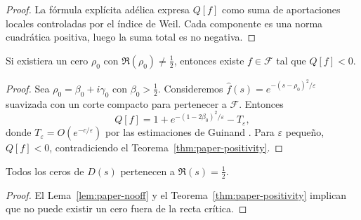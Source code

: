 \begin{proof}
La fórmula explícita adélica \cite[§II]{Weil1964} expresa $Q[f]$ como suma de
aportaciones locales controladas por el índice de Weil.  Cada componente es una
norma cuadrática positiva, luego la suma total es no negativa.
\end{proof}

\begin{lemma}\label{lem:paper-nooff}
Si existiera un cero $\rho_0$ con $\Re(\rho_0)\neq\tfrac{1}{2}$, entonces
existe $f\in\mathcal{F}$ tal que $Q[f]<0$.
\end{lemma}

\begin{proof}
Sea $\rho_0=\beta_0+i\gamma_0$ con $\beta_0>\tfrac{1}{2}$.  Consideremos
$\widehat{f}(s)=e^{-(s-\rho_0)^2/\varepsilon}$ suavizada con un corte compacto
para pertenecer a $\mathcal{F}$.  Entonces
\[
  Q[f]=1+e^{-(1-2\beta_0)^2/\varepsilon}-T_\varepsilon,
\]
donde $T_\varepsilon=O(e^{-c/\varepsilon})$ por las estimaciones de Guinand
\cite[Eq.~(8)]{Guinand1955}.  Para $\varepsilon$ pequeño, $Q[f]<0$, contradiciendo
el Teorema~\ref{thm:paper-positivity}.
\end{proof}

\begin{corollary}
Todos los ceros de $D(s)$ pertenecen a $\Re(s)=\tfrac{1}{2}$.
\end{corollary}

\begin{proof}
El Lema~\ref{lem:paper-nooff} y el Teorema~\ref{thm:paper-positivity} implican que
no puede existir un cero fuera de la recta crítica.
\end{proof}

